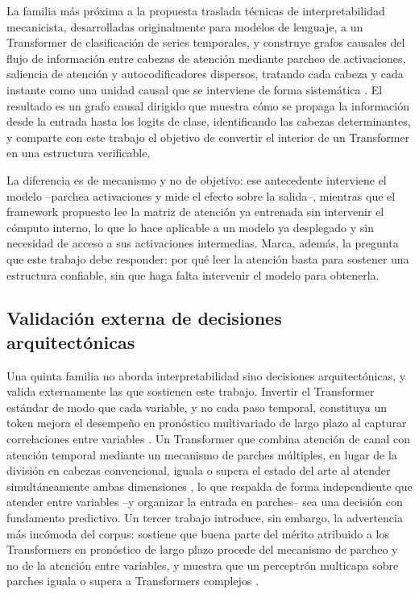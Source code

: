 La familia más próxima a la propuesta traslada técnicas de interpretabilidad mecanicista, desarrolladas originalmente para modelos de lenguaje, a un Transformer de clasificación de series temporales, y construye grafos causales del flujo de información entre cabezas de atención mediante parcheo de activaciones, saliencia de atención y autocodificadores dispersos, tratando cada cabeza y cada instante como una unidad causal que se interviene de forma sistemática \cite{mechinterp2025ts}. El resultado es un grafo causal dirigido que muestra cómo se propaga la información desde la entrada hasta los logits de clase, identificando las cabezas determinantes, y comparte con este trabajo el objetivo de convertir el interior de un Transformer en una estructura verificable.

La diferencia es de mecanismo y no de objetivo: ese antecedente interviene el modelo --parchea activaciones y mide el efecto sobre la salida--, mientras que el framework propuesto lee la matriz de atención ya entrenada sin intervenir el cómputo interno, lo que lo hace aplicable a un modelo ya desplegado y sin necesidad de acceso a sus activaciones intermedias. Marca, además, la pregunta que este trabajo debe responder: por qué leer la atención basta para sostener una estructura confiable, sin que haga falta intervenir el modelo para obtenerla.

\subsection{Validación externa de decisiones arquitectónicas}

Una quinta familia no aborda interpretabilidad sino decisiones arquitectónicas, y valida externamente las que sostienen este trabajo. Invertir el Transformer estándar de modo que cada variable, y no cada paso temporal, constituya un token mejora el desempeño en pronóstico multivariado de largo plazo al capturar correlaciones entre variables \cite{liu2024itransformer}. Un Transformer que combina atención de canal con atención temporal mediante un mecanismo de parches múltiples, en lugar de la división en cabezas convencional, iguala o supera el estado del arte al atender simultáneamente ambas dimensiones \cite{sentinel2025multipatch}, lo que respalda de forma independiente que atender entre variables --y organizar la entrada en parches-- sea una decisión con fundamento predictivo. Un tercer trabajo introduce, sin embargo, la advertencia más incómoda del corpus: sostiene que buena parte del mérito atribuido a los Transformers en pronóstico de largo plazo procede del mecanismo de parcheo y no de la atención entre variables, y muestra que un perceptrón multicapa sobre parches iguala o supera a Transformers complejos \cite{patchmlp2025unlocking}.

